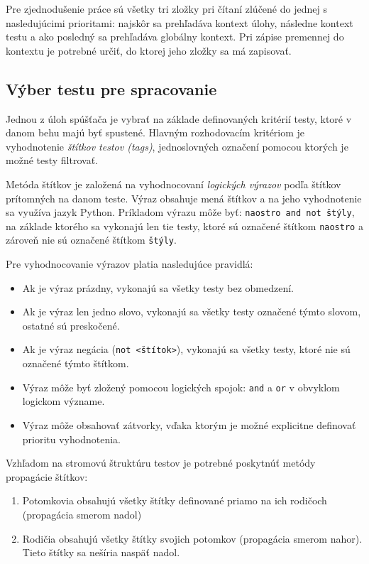 \documentclass[
  digital, %
  twoside, %
  table,   %
  lof,     %
  lot,     %
]{fithesis3}
\begin{document}
Pre zjednodušenie práce sú všetky tri zložky pri čítaní zlúčené do jednej s nasledujúcimi prioritami: najskôr sa prehľadáva kontext úlohy, následne kontext testu a ako posledný sa prehľadáva globálny kontext. Pri zápise premennej do kontextu je potrebné určiť, do ktorej jeho zložky sa má zapisovať. 

\subsection{Výber testu pre spracovanie}

Jednou z úloh spúšťača je vybrať na základe definovaných kritérií testy, ktoré v danom behu majú byť spustené. Hlavným rozhodovacím kritériom je vyhodnotenie \emph{štítkov testov (tags)}, jednoslovných označení pomocou ktorých je možné testy filtrovať.

Metóda štítkov je založená na vyhodnocovaní \emph{logických výrazov} podľa štítkov prítomných na danom teste. Výraz obsahuje mená štítkov a na jeho vyhodnotenie sa využíva jazyk Python. Príkladom výrazu môže byť: \texttt{naostro and not štýly}, na základe ktorého sa vykonajú len tie testy, ktoré sú označené štítkom \texttt{naostro} a zároveň nie sú označené štítkom \texttt{štýly}. 

Pre vyhodnocovanie výrazov platia nasledujúce pravidlá:
\begin{itemize}
    \item Ak je výraz prázdny, vykonajú sa všetky testy bez obmedzení.
    \item Ak je výraz len jedno slovo, vykonajú sa všetky testy označené týmto slovom, ostatné sú preskočené.
    \item Ak je výraz negácia (\texttt{not <štítok>}), vykonajú sa všetky testy, ktoré nie sú označené týmto štítkom.
    \item Výraz môže byť zložený pomocou logických spojok: \texttt{and} a \texttt{or} v obvyklom logickom význame.
    \item Výraz môže obsahovať zátvorky, vďaka ktorým je možné explicitne definovať prioritu vyhodnotenia. 
\end{itemize}

Vzhľadom na stromovú štruktúru testov je potrebné poskytnúť metódy propagácie štítkov:
\begin{enumerate}
    \item Potomkovia obsahujú všetky štítky definované priamo na ich rodičoch (propagácia smerom nadol)
    \item Rodičia obsahujú všetky štítky svojich potomkov (propagácia smerom nahor). Tieto štítky sa nešíria naspäť nadol.
\end{enumerate}
\end{document}
